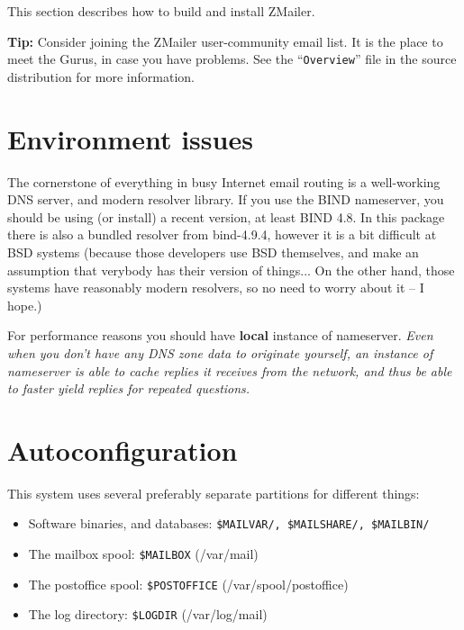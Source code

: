 
This section describes how to build and install ZMailer.

{\bf Tip:} Consider joining the ZMailer user-community email list.
It is the place to meet the Gurus, in case you have problems.
See the ``{\tt Overview}'' file in the source distribution for more
information.

\section{Environment issues}%

The cornerstone of everything in busy Internet email routing
is a well-working DNS server, and modern resolver library.
If you use the BIND nameserver, you should be using (or install)
a recent version, at least BIND 4.8. In this package there is also 
a bundled resolver from  bind-4.9.4, however it is a bit difficult
at BSD systems (because those developers use BSD themselves, and
make an assumption that verybody has their version of things...
On the other hand, those systems have reasonably modern resolvers,
so no need to worry about it -- I hope.) 

For performance reasons you should have {\bf local} instance of
nameserver. {\em Even when you don't have any DNS zone data to
originate yourself, an instance of nameserver is able to cache
replies it receives from the network, and thus be able to faster
yield replies for repeated questions.}


\section{Autoconfiguration}%
%

This system uses several preferably separate partitions for
different things:%
%

\begin{itemize}
\item Software binaries, and databases: {\tt \$MAILVAR/, \$MAILSHARE/, \$MAILBIN/}
\item The mailbox spool: {\tt \$MAILBOX} (/var/mail)
\item The postoffice spool: {\tt \$POSTOFFICE} (/var/spool/postoffice)
\item The log directory: {\tt \$LOGDIR} (/var/log/mail)
\end{itemize}

